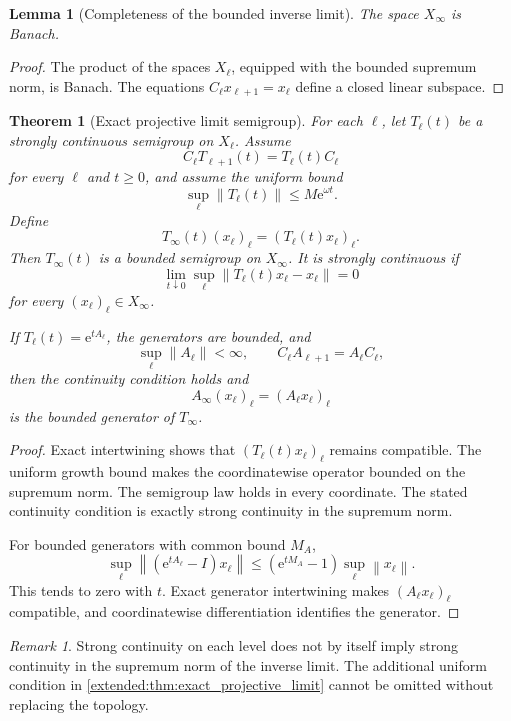\documentclass[11pt,letterpaper]{article}
\newtheorem{theorem}{Theorem}[section]
\theoremstyle{plain}
\theoremstyle{plain}
\newtheorem{lemma}[lemma]{Lemma}
\theoremstyle{plain}
\theoremstyle{definition}
\theoremstyle{definition}
\theoremstyle{definition}
\theoremstyle{definition}
\theoremstyle{definition}
\theoremstyle{remark}
\theoremstyle{remark}
\newtheorem{remark}[remark]{Remark}
\theoremstyle{remark}
\theoremstyle{remark}
\theoremstyle{remark}
\newcommand{\norm}[1]{\left\lVert#1\right\rVert}
\theoremstyle{remark}
\newcommand{\e}{\mathrm e}
\let\KomorebiPrimitivemathrm\mathrm
\renewcommand{\mathrm}[1]{{\KomorebiPrimitivemathrm{#1}}}
\begin{document}
\begin{lemma}[Completeness of the bounded inverse limit]\label{extended:record:015}\label{extended:lem:inverse_limit_banach}
The space \(X_\infty\) is Banach.
\end{lemma}

\begin{proof}
The product of the spaces \(X_\ell\), equipped with the bounded supremum norm, is Banach. The equations \(C_\ell x_{\ell+1}=x_\ell\) define a closed linear subspace.
\end{proof}

\begin{theorem}[Exact projective limit semigroup]\label{extended:record:016}\label{extended:thm:exact_projective_limit}
For each \(\ell\), let \(T_\ell(t)\) be a strongly continuous semigroup on \(X_\ell\). Assume
\[
C_\ell T_{\ell+1}(t)=T_\ell(t)C_\ell
\]
for every \(\ell\) and \(t\geq0\), and assume the uniform bound
\[
\sup_\ell\norm{T_\ell(t)}\leq M\e^{\omega t}.
\]
Define
\[
T_\infty(t)(x_\ell)_\ell
=
(T_\ell(t)x_\ell)_\ell.
\]
Then \(T_\infty(t)\) is a bounded semigroup on \(X_\infty\). It is strongly continuous if
\[
\lim_{t\downarrow0}
\sup_\ell
\norm{T_\ell(t)x_\ell-x_\ell}=0
\]
for every \((x_\ell)_\ell\in X_\infty\).

If \(T_\ell(t)=\e^{tA_\ell}\), the generators are bounded, and
\[
\sup_\ell\norm{A_\ell}<\infty,
\qquad
C_\ell A_{\ell+1}=A_\ell C_\ell,
\]
then the continuity condition holds and
\[
A_\infty(x_\ell)_\ell=(A_\ell x_\ell)_\ell
\]
is the bounded generator of \(T_\infty\).
\end{theorem}

\begin{proof}
Exact intertwining shows that \((T_\ell(t)x_\ell)_\ell\) remains compatible. The uniform growth bound makes the coordinatewise operator bounded on the supremum norm. The semigroup law holds in every coordinate. The stated continuity condition is exactly strong continuity in the supremum norm.

For bounded generators with common bound \(M_A\),
\[
\sup_\ell
\norm{(\e^{tA_\ell}-I)x_\ell}
\leq
(\e^{tM_A}-1)\sup_\ell\norm{x_\ell}.
\]
This tends to zero with \(t\). Exact generator intertwining makes \((A_\ell x_\ell)_\ell\) compatible, and coordinatewise differentiation identifies the generator.
\end{proof}

\begin{remark}\label{extended:record:017}
Strong continuity on each level does not by itself imply strong continuity in the supremum norm of the inverse limit. The additional uniform condition in \cref{extended:thm:exact_projective_limit} cannot be omitted without replacing the topology.
\end{remark}
\end{document}
